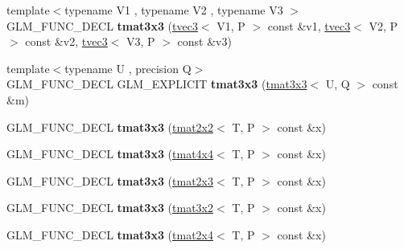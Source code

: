 \begin{DoxyCompactItemize}
\item 
\hypertarget{structglm_1_1tmat3x3_aa124ab387668b4444834f36fb7b02a9d}{{\footnotesize template$<$typename V1 , typename V2 , typename V3 $>$ }\\G\-L\-M\-\_\-\-F\-U\-N\-C\-\_\-\-D\-E\-C\-L {\bfseries tmat3x3} (\hyperlink{structglm_1_1tvec3}{tvec3}$<$ V1, P $>$ const \&v1, \hyperlink{structglm_1_1tvec3}{tvec3}$<$ V2, P $>$ const \&v2, \hyperlink{structglm_1_1tvec3}{tvec3}$<$ V3, P $>$ const \&v3)}\label{structglm_1_1tmat3x3_aa124ab387668b4444834f36fb7b02a9d}

\item 
\hypertarget{structglm_1_1tmat3x3_a7c44285c419a7485e7e558ee66c2a147}{{\footnotesize template$<$typename U , precision Q$>$ }\\G\-L\-M\-\_\-\-F\-U\-N\-C\-\_\-\-D\-E\-C\-L G\-L\-M\-\_\-\-E\-X\-P\-L\-I\-C\-I\-T {\bfseries tmat3x3} (\hyperlink{structglm_1_1tmat3x3}{tmat3x3}$<$ U, Q $>$ const \&m)}\label{structglm_1_1tmat3x3_a7c44285c419a7485e7e558ee66c2a147}

\item 
\hypertarget{structglm_1_1tmat3x3_a2955db7470afc2762caf7a3b6c2ed47d}{G\-L\-M\-\_\-\-F\-U\-N\-C\-\_\-\-D\-E\-C\-L {\bfseries tmat3x3} (\hyperlink{structglm_1_1tmat2x2}{tmat2x2}$<$ T, P $>$ const \&x)}\label{structglm_1_1tmat3x3_a2955db7470afc2762caf7a3b6c2ed47d}

\item 
\hypertarget{structglm_1_1tmat3x3_ab9c3072745780707af1c3d57bd7d01f0}{G\-L\-M\-\_\-\-F\-U\-N\-C\-\_\-\-D\-E\-C\-L {\bfseries tmat3x3} (\hyperlink{structglm_1_1tmat4x4}{tmat4x4}$<$ T, P $>$ const \&x)}\label{structglm_1_1tmat3x3_ab9c3072745780707af1c3d57bd7d01f0}

\item 
\hypertarget{structglm_1_1tmat3x3_ad55a57f99b9571805aa274f50422507a}{G\-L\-M\-\_\-\-F\-U\-N\-C\-\_\-\-D\-E\-C\-L {\bfseries tmat3x3} (\hyperlink{structglm_1_1tmat2x3}{tmat2x3}$<$ T, P $>$ const \&x)}\label{structglm_1_1tmat3x3_ad55a57f99b9571805aa274f50422507a}

\item 
\hypertarget{structglm_1_1tmat3x3_a63210779cd93d3a975c8a616122b8a2e}{G\-L\-M\-\_\-\-F\-U\-N\-C\-\_\-\-D\-E\-C\-L {\bfseries tmat3x3} (\hyperlink{structglm_1_1tmat3x2}{tmat3x2}$<$ T, P $>$ const \&x)}\label{structglm_1_1tmat3x3_a63210779cd93d3a975c8a616122b8a2e}

\item 
\hypertarget{structglm_1_1tmat3x3_ac04149a49ddee46a499f9ef75ee8689d}{G\-L\-M\-\_\-\-F\-U\-N\-C\-\_\-\-D\-E\-C\-L {\bfseries tmat3x3} (\hyperlink{structglm_1_1tmat2x4}{tmat2x4}$<$ T, P $>$ const \&x)}\label{structglm_1_1tmat3x3_ac04149a49ddee46a499f9ef75ee8689d}


\end{DoxyCompactItemize}
